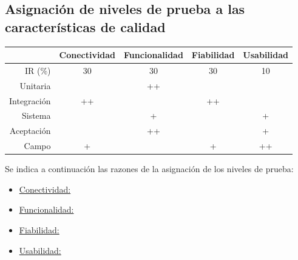 \documentclass[
    11pt,
    spanish,
	a4paper
]{article}
\begin{document}
\subsection{Asignación de niveles de prueba a las características de calidad}
\label{sub:asignacion}

\begin{table}[H]
	\centering
	\begin{tabular}{r|cccc}
        & Conectividad & Funcionalidad & Fiabilidad & Usabilidad \\ \hline
        IR (\%)     & 30 & 30 & 30 & 10 \\
        Unitaria    &    & ++ &    &    \\
        Integración & ++ &    & ++ &    \\
        Sistema     &    & +  &    & +  \\
        Aceptación  &    & ++ &    & +  \\
        Campo       & +  &    & +  & ++ \\
	\end{tabular}
\end{table}

Se indica a continuación las razones de la asignación de los niveles de prueba:

\begin{itemize}
    \item \underline{Conectividad:}
    \item \underline{Funcionalidad:}
    \item \underline{Fiabilidad:}
    \item \underline{Usabilidad:}
\end{itemize}
\end{document}
